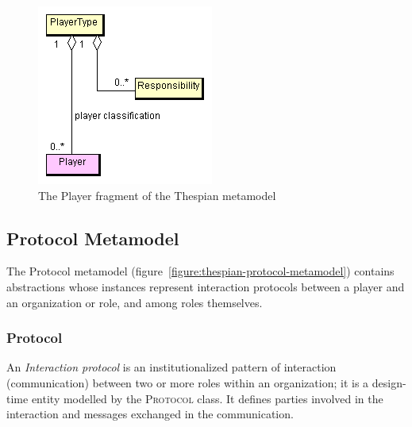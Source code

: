 \begin{figure}[ht]
	\centering
	\includegraphics[width=\textwidth]{images/thespian/player-metamodel.png}
	\caption{The Player fragment of the Thespian metamodel}
	\label{figure:thespian-player-metamodel}
\end{figure}

\subsection{Protocol Metamodel}

The Protocol metamodel (figure~\ref{figure:thespian-protocol-metamodel}) contains abstractions whose instances represent interaction protocols between a player and an organization or role, and among roles themselves.

\subsubsection*{Protocol}

An \textit{Interaction protocol} is an institutionalized pattern of interaction (communication) between two or more roles within an organization; it is a design-time entity modelled by the \textsc{Protocol} class.
It defines parties involved in the interaction and messages exchanged in the communication.

